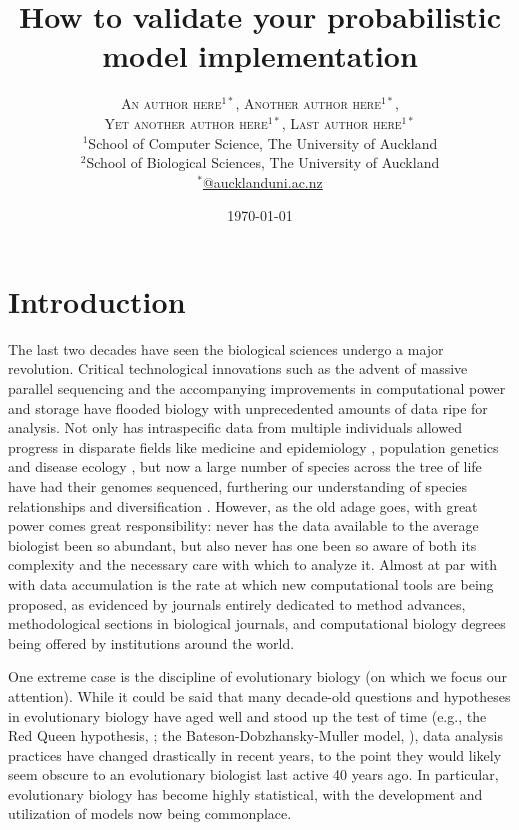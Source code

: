\documentclass[oneside]{article}
\title{How to validate your probabilistic model implementation} %
\author{\textsc{An author here$^{1*}$}, \textsc{Another author
    here$^{1*}$}, \\ \textsc{Yet another author here$^{1*}$},
  \textsc{Last author here$^{1*}$} \\
\small $^1$School of Computer Science, The University of Auckland\\
\small $^2$School of Biological Sciences, The University of Auckland\\
\small \href{mailto:@aucklanduni.ac.nz}{$^*$@aucklanduni.ac.nz}
}
\date{\today} %
\begin{document}
\maketitle


\section*{Introduction}
The last two decades have seen the biological sciences undergo a major revolution.
Critical technological innovations such as the advent of massive parallel sequencing and the accompanying improvements in computational power and storage have flooded biology with unprecedented amounts of data ripe for analysis.
Not only has intraspecific data from multiple individuals allowed
progress in disparate fields like medicine and epidemiology
\citep[e.g.,][]{1000g,humanmicrobiome,neafsey15}, population genetics \citep[e.g.,][]{lynch07,lack16,demanuel16} and disease ecology \citep[e.g.][]{rosenblum13,bates18}, but now a large number of species across the tree of life have had their genomes sequenced, furthering our understanding of species relationships and diversification \citep[e.g.,][]{martin13,brawand14,jarvis14,novikova16,pease2016,upham19}.
However, as the old adage goes, with great power comes great responsibility: never has the data available to the average biologist been so abundant, but also never has one been so aware of both its complexity and the necessary care with which to analyze it.
Almost at par with with data accumulation is the rate at which new computational tools are being proposed, as evidenced by journals entirely dedicated to method advances, methodological sections in biological journals, and computational biology degrees being offered by institutions around the world.

One extreme case is the discipline of evolutionary biology (on which we focus our attention).
While it could be said that many decade-old questions and hypotheses
in evolutionary biology have aged well and stood up the test of time
(e.g., the Red Queen hypothesis,
\citealt{vanvalen73,lively87,morran11,gibson15}; the
Bateson-Dobzhansky-Muller model, \citealt{dob36,muller40,hopkins12,roda17}), data analysis
practices have changed drastically in recent years, to the
point they would likely seem obscure to an evolutionary biologist last active 40 years ago.
In particular, evolutionary biology has become highly statistical, with the development and utilization of models now being commonplace.
\end{document}
